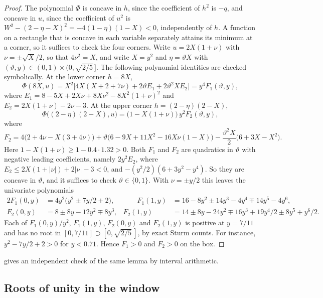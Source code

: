 \documentclass[11pt, a4paper]{article}
\theoremstyle{definition}
\begin{document}
\begin{proof}
  The polynomial $\Phi$ is concave in $h$, since the coefficient of $h^2$ is $-q$, and concave in $u$, since the
  coefficient of $u^2$ is $W^2-(2-\eta-X)^2=-4(1-\eta)(1-X)<0$, independently of $h$. A function on a rectangle that is concave in each
  variable separately attains its minimum at a corner, so it suffices to check the four corners. Write $u=2X(1+\nu)$
  with $\nu=\pm\sqrt X/2$, so that $4\nu^2=X$, and write $X=y^2$ and $\eta=\vartheta X$ with
  $(\vartheta,y)\in(0,1)\times(0,\sqrt{2/5}\,]$. The following polynomial identities are checked symbolically. At the
  lower corner $h=8X$,
  \begin{equation}
    \Phi(8X,u)=X^2\bigl[4X(X+2+7\nu)+2\vartheta E_1+2\vartheta^2XE_2\bigr]=y^4F_1(\vartheta,y),
    \label{eq:corner1}
  \end{equation}
  where $E_1=8-5X+2X\nu+8X\nu^2-8X^2(1+\nu)^2$ and $E_2=2X(1+\nu)-2\nu-3$. At the upper corner $h=(2-\eta)(2-X)$,
  \begin{equation}
    \Phi\bigl((2-\eta)(2-X),u\bigr)=\bigl(1-X(1+\nu)\bigr)\,y^2F_2(\vartheta,y),
    \label{eq:corner2}
  \end{equation}
  where
  \[
    F_2=4\bigl(2+4\nu-X(3+4\nu)\bigr)+\vartheta\bigl(6-9X+11X^2-16X\nu(1-X)\bigr)-\frac{\vartheta^2X}{2}\bigl(6+3X-X^2\bigr).
  \]
  Here $1-X(1+\nu)\ge1-0.4\cdot1.32>0$. Both $F_1$ and $F_2$ are quadratics in $\vartheta$ with negative leading
  coefficients, namely $2y^2E_2$, where $E_2\le2X(1+|\nu|)+2|\nu|-3<0$, and $-(y^2/2)(6+3y^2-y^4)$. So they are
  concave in $\vartheta$, and it suffices to check $\vartheta\in\{0,1\}$. With $\nu=\pm y/2$ this leaves the univariate
  polynomials
  \begin{alignat*}{2}
    F_1(0,y)&=4y^2\bigl(y^2\pm7y/2+2\bigr), &\qquad F_1(1,y)&=16-8y^2\pm14y^3-4y^4\mp14y^5-4y^6,\\
    F_2(0,y)&=8\pm8y-12y^2\mp8y^3, & F_2(1,y)&=14\pm8y-24y^2\mp16y^3+19y^4/2\pm8y^5+y^6/2.
  \end{alignat*}
  Each of $F_1(0,y)/y^2$, $F_1(1,y)$, $F_2(0,y)$ and $F_2(1,y)$ is positive at $y=7/11$ and has no root in
  $[0,7/11]\supset[0,\sqrt{2/5}\,]$, by exact Sturm counts. For instance, $y^2-7y/2+2>0$ for $y<0.71$. Hence
  $F_1>0$ and $F_2>0$ on the box.
\end{proof}

 gives an independent check of the same lemma by interval arithmetic.

\subsection{Roots of unity in the window}
\end{document}

